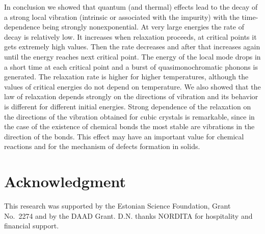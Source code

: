 In conclusion we showed that quantum (and thermal) effects lead to  
the decay of a strong local vibration (intrinsic or associated with the 
impurity) with the time-dependence being strongly nonexponential. 
At very large energies the rate of decay is relatively low. It increases
when relaxation proceeds, at critical points it gets extremely high values.
Then the rate decreases and after that increases again until the energy 
reaches next critical point. The energy of the local mode drops in a short 
time at each critical point and a burst
of quasimonochromatic phonons is generated. The relaxation rate is higher for
higher temperatures, although the values of critical energies do not depend on
temperature. We also showed that the law of relaxation depends strongly on the
directions of vibration and its behavior is different for different
initial energies. Strong dependence of the relaxation on the directions
of the vibration obtained for cubic crystals is remarkable, since in the case
of the existence of chemical bonds the most stable are vibrations in the
direction of the bonds. This effect may have an important value for
chemical reactions and for the mechanism of defects formation in solids.
\section{Acknowledgment}
This research was supported by the Estonian Science Foundation, 
Grant No.~2274 and by the DAAD Grant. D.N. thanks NORDITA for hospitality
and financial support.

